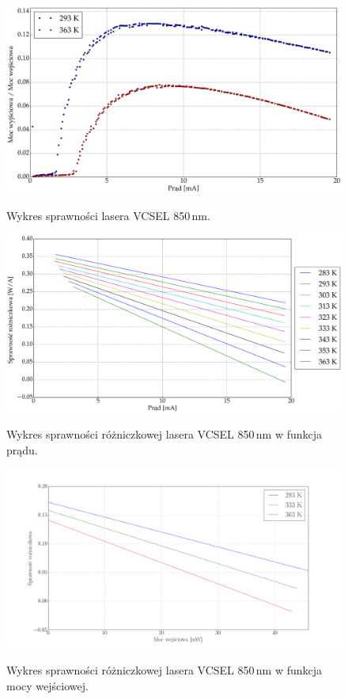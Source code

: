 \documentclass[a4paper, portrait,12pt]{mwrep}
\begin{document}
\begin{figure}
\center
  \includegraphics[scale=0.30]{plot_vcsel850/plot_eff.eps}
  \label{rys1}
  \caption{Wykres sprawności lasera VCSEL 850\,nm.} 
\end{figure}
\begin{figure}
\center
  \includegraphics[scale=0.30]{plot_vcsel850/plot_eff_all_via_current.eps}
  \label{rys1}
  \caption{Wykres sprawności różniczkowej lasera VCSEL 850\,nm w funkcja prądu.} 
\end{figure}
\begin{figure}
\center
  \includegraphics[scale=0.30]{plot_vcsel850/plot_slope_eff_via_power.png}
  \label{rys1}
  \caption{Wykres sprawności różniczkowej lasera VCSEL 850\,nm w funkcja mocy wejściowej.} 
\end{figure}
\end{document}
